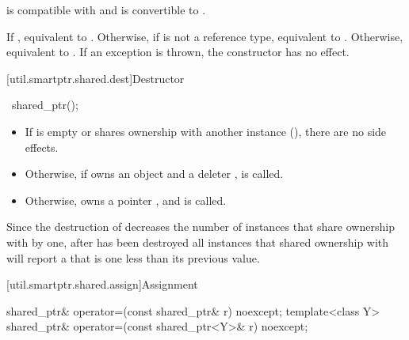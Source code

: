 \begin{itemdescr}
\pnum
\constraints
{} is compatible with  and
 is convertible to .

\pnum
\effects
If , equivalent to .
Otherwise, if  is not a reference type,
equivalent to .
Otherwise, equivalent to .
If an exception is thrown, the constructor has no effect.
\end{itemdescr}

[util.smartptr.shared.dest]{Destructor}

%
\begin{itemdecl}
~shared_ptr();
\end{itemdecl}

\begin{itemdescr}
\pnum
\effects
\begin{itemize}
\item If  is empty or shares ownership with another
 instance (), there are no side effects.

\item
Otherwise, if  owns an object
 and a deleter ,  is called.

\item Otherwise,  owns a pointer ,
and  is called.
\end{itemize}
\end{itemdescr}

\pnum
\begin{note}
Since the destruction of 
decreases the number of instances that share ownership with 
by one,
after  has been destroyed
all  instances that shared ownership with
 will report a  that is one less
than its previous value.
\end{note}

[util.smartptr.shared.assign]{Assignment}

%
\begin{itemdecl}
shared_ptr& operator=(const shared_ptr& r) noexcept;
template<class Y> shared_ptr& operator=(const shared_ptr<Y>& r) noexcept;
\end{itemdecl}

